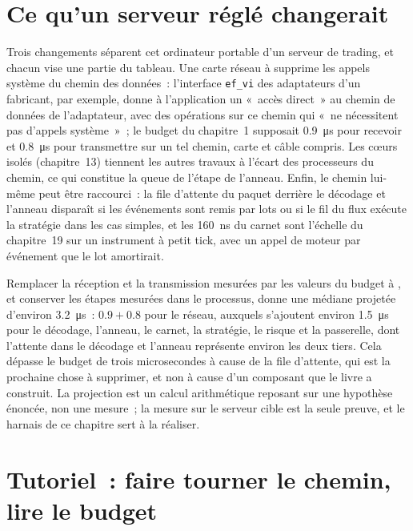 \section{Ce qu'un serveur réglé changerait}

Trois changements séparent cet ordinateur portable d'un serveur de trading, et chacun vise une partie du tableau. Une carte réseau à 
supprime les appels système du chemin des données~: l'interface \texttt{ef\_vi} des adaptateurs d'un fabricant, par exemple, donne à l'application un
«~accès direct~» au chemin de données de l'adaptateur, avec des opérations sur ce chemin qui «~ne nécessitent pas d'appels système~»~;
le budget du chapitre~1 supposait \qty{0.9}{\micro\second} pour recevoir et \qty{0.8}{\micro\second} pour transmettre sur un tel chemin, carte et câble compris. Les cœurs isolés
(chapitre~13) tiennent les autres travaux à l'écart des processeurs du chemin, ce qui constitue la queue de l'étape de l'anneau. Enfin, le chemin lui-même
peut être raccourci~: la file d'attente du paquet derrière le décodage et l'anneau disparaît si les événements sont remis par lots ou si
le fil du flux exécute la stratégie dans les cas simples, et les \qty{160}{\nano\second} du carnet sont l'échelle du chapitre~19 sur un
instrument à petit tick, avec un appel de moteur par événement que le lot amortirait.

Remplacer la réception et la transmission mesurées par les valeurs du budget à , et conserver les étapes mesurées dans le processus,
donne une médiane projetée d'environ \qty{3.2}{\micro\second}~: $0.9 + 0.8$ pour le réseau, auxquels s'ajoutent environ \qty{1.5}{\micro\second} pour
le décodage, l'anneau, le carnet, la stratégie, le risque et la passerelle, dont l'attente dans le décodage et l'anneau représente environ les deux tiers. Cela dépasse le
budget de trois microsecondes à cause de la file d'attente, qui est la prochaine chose à supprimer, et non à cause d'un composant que le livre a construit. La projection est
un calcul arithmétique reposant sur une hypothèse énoncée, non une mesure~; la mesure sur le serveur cible est la seule preuve, et le harnais
de ce chapitre sert à la réaliser.

\section{Tutoriel~: faire tourner le chemin, lire le budget}\label{tut:ll:build-tick-to-trade-measured:tut}

